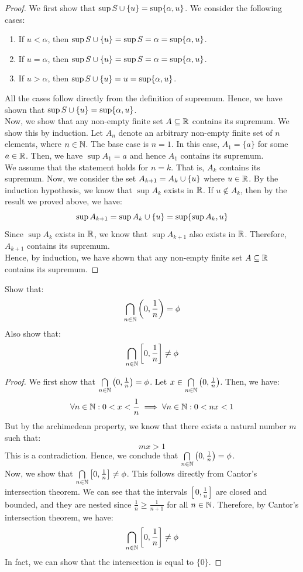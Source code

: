 \documentclass[openany]{book}
\begin{document}
\begin{proof}
    We first show that $\sup S \cup \{u\} = \sup \{\alpha, u\}$. 
    We consider the following cases: 
    \begin{enumerate}
        \item If $u < \alpha$, then $\sup S \cup \{u\} = \sup S = \alpha = \sup \{\alpha, u\}$.
        \item If $u = \alpha$, then $\sup S \cup \{u\} = \sup S = \alpha = \sup \{\alpha, u\}$.
        \item If $u > \alpha$, then $\sup S \cup \{u\} = u = \sup \{\alpha, u\}$.
    \end{enumerate}
    All the cases follow directly from the definition of supremum. Hence, we have shown that $\sup S \cup \{u\} = \sup \{\alpha, u\}$. \\
    Now, we show that any non-empty finite set $A \subseteq \mathbb{R}$ contains its supremum. We show this by induction. Let $A_n$ denote an arbitrary non-empty finite set of $n$ elements, where $n \in \mathbb{N}$. 
    The base case is $n = 1$. In this case, $A_1 = \{a\}$ for some $a \in \mathbb{R}$. Then, we have $\sup A_1 = a$ and hence $A_1$ contains its supremum. \\
    We assume that the statement holds for $n = k$. That is, $A_k$ contains its supremum. Now, we consider the set $A_{k+1} = A_k \cup \{u\}$ where $u \in \mathbb{R}$. By the induction hypothesis, we know that $\sup A_k$ exists in $\mathbb{R}$. If $u \notin A_k$, then by the result we proved above, we have:
    $$\sup A_{k+1} = \sup A_k \cup \{u\} = \sup \{\sup A_k, u\}$$
    Since $\sup A_k$ exists in $\mathbb{R}$, we know that $\sup A_{k+1}$ also exists in $\mathbb{R}$. Therefore, $A_{k+1}$ contains its supremum. \\
    Hence, by induction, we have shown that any non-empty finite set $A \subseteq \mathbb{R}$ contains its supremum.
\end{proof}
\begin{exercise}
    Show that: 
    $$\bigcap\limits_{n \in \mathbb{N}}^{}\left(0, \frac{1}{n}\right) = \phi$$
    Also show that: 
    $$\bigcap\limits_{n \in \mathbb{N}}^{}\left[0, \frac{1}{n}\right] \neq \phi$$
\end{exercise}
\begin{proof}
    We first show that $\bigcap\limits_{n \in \mathbb{N}}^{}\left(0, \frac{1}{n}\right) = \phi$. 
    Let $x \in \bigcap\limits_{n \in \mathbb{N}}^{}\left(0, \frac{1}{n}\right)$. Then, we have:
    $$\forall n \in \mathbb{N}: 0 < x < \frac{1}{n} \implies \forall n \in \mathbb{N}: 0 < nx < 1$$
    But by the archimedean property, we know that there exists a natural number $m$ such that:
    $$mx > 1$$
    This is a contradiction. 
    Hence, we conclude that $\bigcap\limits_{n \in \mathbb{N}}^{}\left(0, \frac{1}{n}\right) = \phi$. \\ 
    Now, we show that $\bigcap\limits_{n \in \mathbb{N}}^{}\left[0, \frac{1}{n}\right] \neq \phi$. This follows directly from Cantor's intersection theorem. We can see that the intervals $\left[0, \frac{1}{n}\right]$ are closed and bounded, and they are nested since $\frac{1}{n} \geq \frac{1}{n+1}$ for all $n \in \mathbb{N}$. Therefore, by Cantor's intersection theorem, we have:
    $$\bigcap\limits_{n \in \mathbb{N}}^{}\left[0, \frac{1}{n}\right] \neq \phi$$
    In fact, we can show that the intersection is equal to $\{0\}$.
\end{proof}
\end{document}
